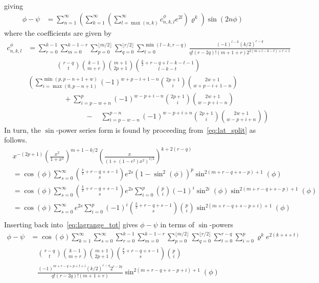 \documentclass[a4paper]{amsart}
\begin{document}
%
giving
\begin{align*}
\phi-\psi &= \sum_{n=1}^\infty\left(\sum_{k=1}^\infty\left(\sum_{l=\max(n,k)}^\infty c^\phi_{n,k,l}e^{2l}\right)\varrho^k\right)\sin(2n\phi)
\end{align*}
where the coefficients are given by
\begin{align}
c^\phi_{n,k,l}&=\sum^{k-1}_{r=0}\sum^{k-1-r}_{m=0}\sum^{\lfloor m/2\rfloor}_{p=0}\sum_{q=0}^{\lfloor r/2\rfloor}\sum_{t=0}^{\min(l-k,r-q)}\frac{(-1)^{l-k}(k/2)^{\overline{r-q}}}{q!(r-2q)!(m+1+r)2^{2(m+l-k-t)+r+1}}\nonumber\\
&\quad\quad\quad\quad\binom{r-q}{t}\binom{k-1}{m+r}\binom{m+1}{2p+1}\binom{\frac{k}{2}+r-q+l-k-t-1}{l-k-t}\nonumber\\
&\left(\sum_{i=\max(0,p-n+1)}^{\min(p, p-n+1+w)}(-1)^{w+p-i+1-n}\binom{2p+1}{i}\binom{2w+1}{w+p-i+1-n}\right.\nonumber\\
&\quad\quad\quad\quad\quad+\sum_{i=p-w+n}^{p}(-1)^{w-p+i-n}\binom{2p+1}{i}\binom{2w+1}{w-p+i-n}\nonumber\\
&\left.\quad\quad\quad\quad\quad\quad\quad\quad-\quad \sum_{i=p-w-n}^{p-n}(-1)^{w-p+i+n}\binom{2p+1}{i}\binom{2w+1}{w-p+i+n}\right)\label{eq:c_phi}
\end{align}
%
In turn, the $\sin$-power series form is found by proceeding from~\eqref{eq:lat_split} as follows.
\begin{align*}
&x^{-(2p+1)}\left(\frac{x^2}{1 + x^2}\right)^{m+1-k/2}\left(\frac{x}{(1+(1-e^2)x^2)^{1/2}}\right)^{k+2(r-q)}\\
&=\cos(\phi)\sum_{s=0}^\infty\binom{\frac{k}{2}+r-q+s-1}{s}e^{2s}(1-\sin^{2}(\phi))^p\sin^{2(m+r-q+s-p)+1}(\phi)\\
&=\cos(\phi)\sum_{s=0}^\infty\binom{\frac{k}{2}+r-q+s-1}{s}e^{2s}\sum_{i=0}^{p}\binom{p}{i}(-1)^i\sin^{2i}(\phi)\sin^{2(m+r-q+s-p)+1}(\phi)\\
&=\cos(\phi)\sum_{s=0}^\infty e^{2s}\sum_{i=0}^{p}(-1)^i\binom{\frac{k}{2}+r-q+s-1}{s}\binom{p}{i}\sin^{2(m+r-q+s-p+i)+1}(\phi)\\
\end{align*}
Inserting back into~\eqref{eq:lagrange_tot} gives $\phi-\psi$ in terms of $\sin$-powers
\begin{align*}
\phi-\psi &= \cos(\phi)\sum_{k=1}^\infty\sum_{s=0}^\infty\sum^{k-1}_{r=0}\sum^{k-1-r}_{m=0}\sum^{\lfloor m/2\rfloor}_{p=0}\sum_{q=0}^{\lfloor r/2\rfloor}\sum_{t=0}^{r-q}\sum_{i=0}^{p}\varrho^k e^{2(k+s+t)}\\
&\quad\binom{r-q}{t}\binom{k-1}{m+r}\binom{m+1}{2p+1}\binom{\frac{k}{2}+r-q+s-1}{s}\binom{p}{i}\\
&\quad\frac{(-1)^{m+r-q+p+t+i}(k/2)^{\overline{r-q}}2^{r-2q}}{q!(r-2q)!(m+1+r)}\sin^{2(m+r-q+s-p+i)+1}(\phi)\\
\end{align*}
\end{document}
